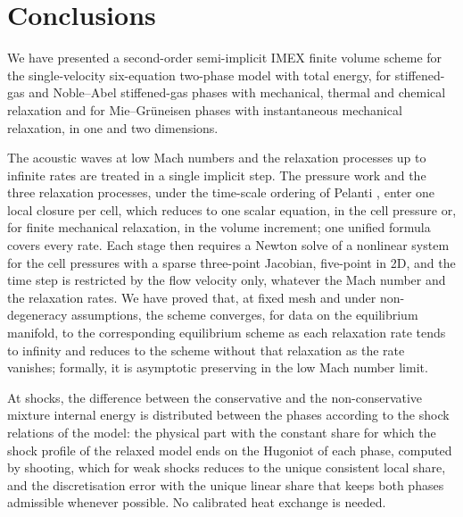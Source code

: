 \section{Conclusions}
\label{sec:conclusions}

We have presented a second-order semi-implicit IMEX finite volume scheme for the single-velocity six-equation
two-phase model with total energy, for stiffened-gas and Noble--Abel stiffened-gas phases with mechanical, thermal and
chemical relaxation and for Mie--Gr\"uneisen phases with instantaneous mechanical relaxation, in one and two
dimensions.

The acoustic waves at low Mach numbers and the relaxation processes up to infinite rates are treated in a single
implicit step. The pressure work and the three relaxation processes, under the time-scale ordering of Pelanti
\cite{Pelanti2022}, enter one local closure per cell, which reduces to one scalar equation, in the cell pressure or,
for finite mechanical relaxation, in the volume increment; one unified formula covers every rate. Each stage then
requires a Newton solve of a nonlinear system for the cell pressures with a sparse three-point Jacobian, five-point in
2D, and the time step is restricted by the flow velocity only, whatever the Mach number and the relaxation rates. We
have proved that, at fixed mesh and under non-degeneracy assumptions, the scheme converges, for data on the
equilibrium manifold, to the corresponding equilibrium scheme as each relaxation rate tends to infinity and reduces to
the scheme without that relaxation as the rate vanishes; formally, it is asymptotic preserving in the low Mach number
limit.

At shocks, the difference between the conservative and the non-conservative mixture internal energy is distributed
between the phases according to the shock relations of the model: the physical part with the constant share for which
the shock profile of the relaxed model ends on the Hugoniot of each phase, computed by shooting, which for weak shocks
reduces to the unique consistent local share, and the discretisation error with the unique linear share that keeps
both phases admissible whenever possible. No calibrated heat exchange is needed.

